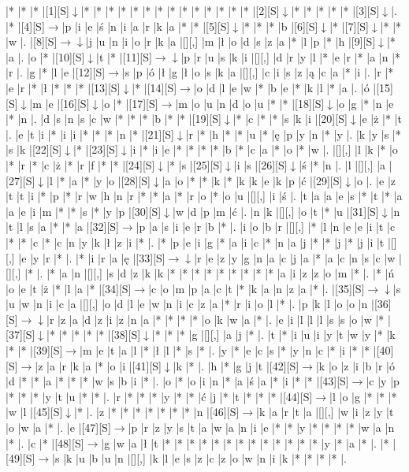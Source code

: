 \documentclass[11pt]{article}
\newcommand\drarr{$\rightarrow \!\!\!\!\! \downarrow$}
\newcommand\rarr{$\rightarrow$}
\newcommand\darr{$\downarrow$}
\begin{document}
\noindent\begin{Puzzle}{24}{31}|*	|*	|*	|[1][S]\darr	|*	|*	|*	|*	|*	|*	|*	|*	|*	|*	|*	|*	|*	|*	|[2][S]\darr	|*	|*	|*	|*	|*	|[3][S]\darr	|.
|*	|[4][S]\rarr	|p	|i	|e	|ś	|n	|i	|a	|r	|k	|a	|*	|*	|[5][S]\darr	|*	|*	|*	|b	|[6][S]\darr	|*	|[7][S]\darr	|*	|*	|w	|.
|[8][S]\drarr	|j	|u	|n	|i	|o	|r	|k	|a	|[][,]{ }	|m	|ł	|o	|d	|s	|z	|a	|*	|l	|p	|*	|h	|[9][S]\darr	|*	|a	|.
|o	|*	|[10][S]\darr	|t	|*	|[11][S]\drarr	|p	|r	|u	|s	|k	|i	|[][,]{ }	|d	|r	|y	|l	|*	|e	|r	|*	|a	|n	|*	|r	|.
|g	|*	|l	|e	|[12][S]\rarr	|s	|p	|ó	|ł	|g	|ł	|o	|s	|k	|a	|[][,]{ }	|c	|i	|s	|z	|ą	|c	|a	|*	|i	|.
|r	|*	|e	|r	|*	|ł	|*	|*	|*	|[13][S]\darr	|*	|[14][S]\rarr	|o	|d	|l	|e	|w	|*	|b	|e	|*	|k	|l	|*	|a	|.
|ó	|[15][S]\darr	|m	|e	|[16][S]\darr	|o	|*	|[17][S]\rarr	|m	|o	|u	|n	|d	|o	|u	|*	|*	|[18][S]\darr	|o	|g	|*	|n	|e	|*	|n	|.
|d	|s	|n	|s	|c	|w	|*	|*	|*	|b	|*	|*	|[19][S]\darr	|*	|c	|*	|*	|s	|k	|i	|[20][S]\darr	|e	|ż	|*	|t	|.
|e	|t	|i	|*	|i	|i	|*	|*	|*	|n	|*	|[21][S]\darr	|r	|*	|h	|*	|*	|u	|*	|ę	|p	|y	|n	|*	|y	|.
|k	|y	|s	|*	|s	|k	|[22][S]\darr	|*	|[23][S]\darr	|i	|*	|i	|e	|*	|*	|*	|*	|b	|*	|c	|a	|*	|o	|*	|w	|.
|[][,]{ }	|l	|k	|*	|o	|*	|r	|*	|c	|ż	|*	|r	|f	|*	|*	|[24][S]\darr	|*	|s	|[25][S]\darr	|i	|s	|[26][S]\darr	|ś	|*	|n	|.
|l	|[][,]{ }	|a	|[27][S]\darr	|l	|*	|a	|*	|y	|o	|[28][S]\darr	|a	|o	|*	|*	|k	|*	|k	|k	|e	|k	|p	|ć	|[29][S]\darr	|o	|.
|e	|z	|t	|t	|i	|*	|p	|*	|r	|w	|h	|n	|r	|*	|*	|a	|*	|r	|o	|*	|o	|u	|[][,]{ }	|i	|ś	|.
|t	|a	|a	|e	|s	|*	|t	|*	|a	|a	|e	|i	|m	|*	|*	|s	|*	|y	|p	|[30][S]\darr	|w	|d	|p	|m	|ć	|.
|n	|k	|[][,]{ }	|o	|t	|*	|u	|[31][S]\darr	|n	|t	|l	|s	|a	|*	|*	|a	|[32][S]\rarr	|p	|a	|s	|i	|e	|r	|b	|*	|.
|i	|o	|b	|r	|[][,]{ }	|*	|l	|n	|e	|e	|i	|t	|c	|*	|*	|c	|*	|c	|n	|y	|k	|ł	|z	|i	|*	|.
|*	|p	|e	|i	|g	|*	|a	|i	|c	|*	|n	|a	|j	|*	|*	|j	|*	|j	|i	|t	|[][,]{ }	|e	|y	|r	|*	|.
|*	|i	|r	|a	|ę	|[33][S]\drarr	|r	|e	|z	|y	|g	|n	|a	|c	|j	|a	|*	|a	|c	|n	|s	|c	|w	|[][,]{ }	|*	|.
|*	|a	|n	|[][,]{ }	|s	|d	|z	|k	|k	|*	|*	|*	|*	|*	|*	|*	|*	|*	|a	|i	|z	|z	|o	|m	|*	|.
|*	|ń	|o	|e	|t	|ż	|*	|l	|a	|*	|[34][S]\rarr	|c	|o	|m	|p	|a	|c	|t	|*	|k	|a	|n	|z	|a	|*	|.
|[35][S]\drarr	|s	|u	|w	|n	|i	|c	|a	|[][,]{ }	|o	|d	|l	|e	|w	|n	|i	|c	|z	|a	|*	|r	|i	|o	|l	|*	|.
|p	|k	|l	|o	|o	|n	|[36][S]\drarr	|r	|z	|a	|d	|z	|i	|z	|n	|a	|*	|*	|*	|*	|o	|k	|w	|a	|*	|.
|e	|i	|l	|l	|l	|s	|s	|o	|w	|*	|[37][S]\darr	|*	|*	|*	|*	|*	|[38][S]\darr	|*	|*	|*	|g	|[][,]{ }	|a	|j	|*	|.
|t	|*	|i	|u	|i	|y	|t	|w	|y	|*	|k	|*	|*	|[39][S]\rarr	|m	|e	|t	|a	|l	|*	|ł	|l	|*	|s	|*	|.
|y	|*	|e	|c	|s	|*	|y	|n	|c	|*	|i	|*	|*	|[40][S]\rarr	|z	|a	|r	|k	|a	|*	|o	|i	|[41][S]\darr	|k	|*	|.
|h	|*	|g	|j	|t	|[42][S]\rarr	|k	|o	|z	|i	|b	|r	|ó	|d	|*	|*	|a	|*	|*	|*	|w	|s	|b	|i	|*	|.
|o	|*	|o	|i	|n	|*	|a	|ś	|a	|*	|i	|*	|*	|[43][S]\rarr	|c	|y	|p	|*	|*	|*	|y	|t	|u	|*	|*	|.
|r	|*	|*	|*	|y	|*	|*	|ć	|j	|*	|t	|*	|*	|*	|[44][S]\rarr	|l	|o	|g	|*	|*	|*	|w	|l	|[45][S]\darr	|*	|.
|z	|*	|*	|*	|*	|*	|*	|*	|n	|[46][S]\rarr	|k	|a	|r	|t	|a	|[][,]{ }	|w	|i	|z	|y	|t	|o	|w	|a	|*	|.
|e	|[47][S]\rarr	|p	|r	|z	|y	|s	|t	|a	|w	|a	|n	|i	|e	|*	|*	|y	|*	|*	|*	|*	|w	|a	|n	|*	|.
|c	|*	|[48][S]\rarr	|g	|w	|a	|ł	|t	|*	|*	|*	|*	|*	|*	|*	|*	|*	|*	|*	|*	|*	|y	|*	|a	|*	|.
|*	|[49][S]\rarr	|s	|k	|u	|b	|u	|n	|[][,]{ }	|k	|l	|e	|s	|z	|c	|z	|o	|w	|n	|i	|k	|*	|*	|*	|*	|.\end{Puzzle}
\end{document}
